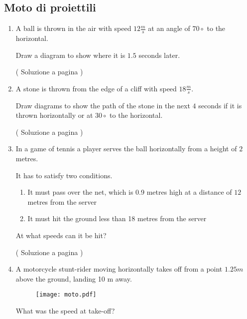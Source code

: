 \subsection{Moto di proiettili}

\begin{enumerate}

\item A ball is thrown in the air with speed $12\frac{m}{s}$ at an angle of $70\circ$ to the horizontal.  \label{ex_p_1}

Draw a diagram to show where it is $1.5$ seconds later.

( Soluzione a pagina \pageref{sol_p_1} )

\item A stone is thrown from the edge of a cliff with speed $18 \frac{m}{s}$.

Draw diagrams to show the path of the stone in the next $4$ seconds if it is thrown horizontally or at $30\circ$ to the horizontal. \label{ex_p_2}

( Soluzione a pagina \pageref{sol_p_2} )

\item In a game of tennis a player serves the ball horizontally from a height of $2$ metres.\label{ex_p_3}

It has to satisfy two conditions.
\begin{enumerate}
\item It must pass over the net, which is 0.9 metres high at a distance of $12$ metres from the server
\item It must hit the ground less than 18 metres from the server
\end{enumerate}

At what speeds can it be hit?

( Soluzione a pagina \pageref{sol_p_3} )

\item A motorcycle stunt-rider moving horizontally takes off from a point $1.25 m$ above the ground, landing 10 m away. \label{ex_p_4}

\begin{figure}[H]
\centering
\texttt{[image: moto.pdf]}
\end{figure}

What was the speed at take-off?


\end{enumerate}
